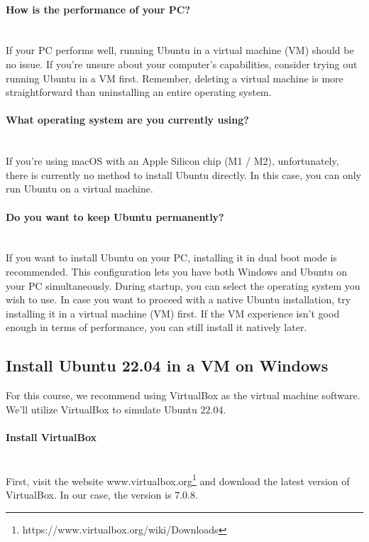 \documentclass{article}
\begin{document}
    \paragraph{How is the performance of your PC?}~\\
     If your PC performs well, running Ubuntu in a virtual machine (VM) should be no issue. If you're unsure about your computer's capabilities, consider trying out running Ubuntu in a VM first. Remember, deleting a virtual machine is more straightforward than uninstalling an entire operating system.

    \paragraph{What operating system are you currently using?}~\\
        If you're using macOS with an Apple Silicon chip (M1 / M2), unfortunately, there is currently no method to install Ubuntu directly. In this case, you can only run Ubuntu on a virtual machine.

    \paragraph{Do you want to keep Ubuntu permanently?}~\\
        If you want to install Ubuntu on your PC, installing it in dual boot mode is recommended. This configuration lets you have both Windows and Ubuntu on your PC simultaneously. During startup, you can select the operating system you wish to use. In case you want to proceed with a native Ubuntu installation, try installing it in a virtual machine (VM) first. If the VM experience isn't good enough in terms of performance, you can still install it natively later.

\subsection{Install Ubuntu 22.04 in a VM on Windows}
For this course, we recommend using VirtualBox as the virtual machine software. We'll utilize VirtualBox to simulate Ubuntu 22.04.

\paragraph{Install VirtualBox}~\\
First, visit the website www.virtualbox.org\footnote{https://www.virtualbox.org/wiki/Downloads} and download the latest version of VirtualBox. In our case, the version is 7.0.8.
\end{document}
